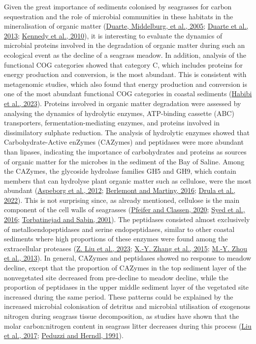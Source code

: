 \documentclass[
  12 pt,
]{book}
\begin{document}
Given the great importance of sediments colonised by seagrasses for carbon sequestration and the role of microbial communities in these habitats in the mineralisation of organic matter (\protect\hyperlink{ref-Duarte2005a}{Duarte, Middelburg, et al., 2005}; \protect\hyperlink{ref-Duarte2013}{Duarte et al., 2013}; \protect\hyperlink{ref-Kennedy2010}{Kennedy et al., 2010}), it is interesting to evaluate the dynamics of microbial proteins involved in the degradation of organic matter during such an ecological event as the decline of a seagrass meadow. In addition, analysis of the functional COG categories showed that category C, which includes proteins for energy production and conversion, is the most abundant. This is consistent with metagenomic studies, which also found that energy production and conversion is one of the most abundant functional COG categories in coastal sediments (\protect\hyperlink{ref-Habibi2023}{Habibi et al., 2023}). Proteins involved in organic matter degradation were assessed by analysing the dynamics of hydrolytic enzymes, ATP-binding cassette (ABC) transporters, fermentation-mediating enzymes, and proteins involved in dissimilatory sulphate reduction. The analysis of hydrolytic enzymes showed that Carbohydrate-Active enZymes (CAZymes) and peptidases were more abundant than lipases, indicating the importance of carbohydrates and proteins as sources of organic matter for the microbes in the sediment of the Bay of Saline. Among the CAZymes, the glycoside hydrolase families GH5 and GH9, which contain members that can hydrolyse plant organic matter such as cellulose, were the most abundant (\protect\hyperlink{ref-Aspeborg2012}{Aspeborg et al., 2012}; \protect\hyperlink{ref-Berlemont2016}{Berlemont and Martiny, 2016}; \protect\hyperlink{ref-Drula2022}{Drula et al., 2022}). This is not surprising since, as already mentioned, cellulose is the main component of the cell walls of seagrasses (\protect\hyperlink{ref-Pfeifer2020}{Pfeifer and Classen, 2020}; \protect\hyperlink{ref-Syed2016}{Syed et al., 2016}; \protect\hyperlink{ref-Torbatinejad2001}{Torbatinejad and Sabin, 2001}). The peptidases consisted almost exclusively of metalloendopeptidases and serine endopeptidases, similar to other coastal sediments where high proportions of these enzymes were found among the extracellular proteases (\protect\hyperlink{ref-Liu2023}{Z. Liu et al., 2023}; \protect\hyperlink{ref-Zhang2015a}{X.-Y. Zhang et al., 2015}; \protect\hyperlink{ref-Zhou2013}{M.-Y. Zhou et al., 2013}). In general, CAZymes and peptidases showed no response to meadow decline, except that the proportion of CAZymes in the top sediment layer of the nonvegetated site decreased from pre-decline to meadow decline, while the proportion of peptidases in the upper middle sediment layer of the vegetated site increased during the same period. These patterns could be explained by the increased microbial colonisation of detritus and microbial utilisation of exogenous nitrogen during seagrass tissue decomposition, as studies have shown that the molar carbon:nitrogen content in seagrass litter decreases during this process (\protect\hyperlink{ref-Liu2017}{Liu et al., 2017}; \protect\hyperlink{ref-Peduzzi1991}{Peduzzi and Herndl, 1991}).
\end{document}
